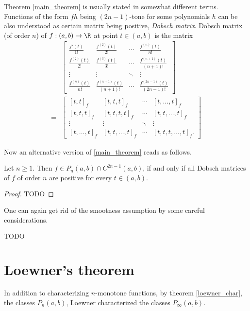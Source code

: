 Theorem \ref{main_theorem} is usually stated in somewhat different terms. Functions of the form $f h$ being $(2 n - 1)$-tone for some polynomials $h$ can be also understood as certain matrix being positive, \textit{Dobsch matrix}. Dobsch matrix (of order $n$) of $f : (a, b) \to \R$ at point $t \in (a, b)$ is the matrix
\begin{align}\label{Dobsch_matrix}
	&\begin{bmatrix}
		\frac{f'(t)}{1!} & \frac{f^{(2)}(t)}{2!} & \cdots & \frac{f^{(n)}(t)}{n!} \\
		\frac{f^{(2)}(t)}{2!} & \frac{f^{(3)}(t)}{3!} & \cdots & \frac{f^{(n + 1)}(t)}{(n + 1)!} \\
		\vdots & \vdots & \ddots & \vdots \\
		\frac{f^{(n)}(t)}{n!} & \frac{f^{(n + 1)}(t)}{(n + 1)!} & \cdots &  \frac{f^{(2 n - 1)}(t)}{(2 n - 1)!}
	\end{bmatrix} \\
	=&
	\begin{bmatrix}
	[t, t]_{f} & [t, t, t]_{f} & \cdots & [t, \ldots, t]_{f}\\
	[t, t, t]_{f} & [t, t, t, t]_{f} & \cdots & [t, t, \ldots, t]_{f} \\
	\vdots & \vdots & \ddots & \vdots \\
	[t, \ldots, t]_{f} & [t, t, \ldots, t]_{f} & \cdots &  [t, t, t, \ldots, t]_{f}.
	\end{bmatrix} \nonumber
\end{align}

Now an alternative version of \ref{main_theorem} reads as follows.

\begin{lause}
	Let $n \geq 1$. Then $f \in P_{n}(a, b) \cap C^{2 n - 1}(a, b)$, if and only if all Dobsch matrices of $f$ of order $n$ are positive for every $t \in (a, b)$.
\end{lause}
\begin{proof}
	TODO
\end{proof}

One can again get rid of the smootness assumption by some careful considerations.

TODO

\section{Loewner's theorem}

In addition to characterizing $n$-monotone functions, by theorem \ref{loewner_char}, the classes $P_{n}(a, b)$, Loewner characterized the classes $P_{\infty}(a, b)$.

